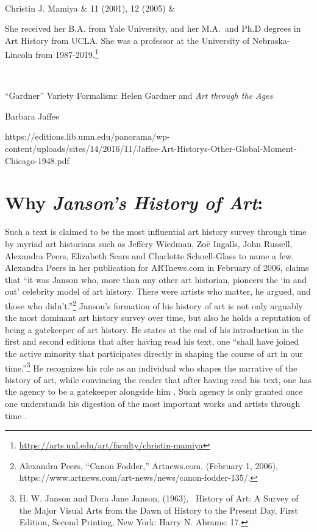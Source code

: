 \documentclass[
  letterpaper,
  DIV=11,
  numbers=noendperiod]{scrreprt}
\begin{document}
\begin{longtable}[]
\begin{minipage}[t]{\linewidth}
{  \hfill\break
}\strut
\end{minipage} \\
Christin J. Mamiya & 11 (2001), 12 (2005) &
\begin{minipage}[t]{\linewidth}\raggedright
She received her B.A. from Yale University, and her M.A.~and Ph.D
degrees in Art History from UCLA. She was a professor at the University
of Nebraska-Lincoln from 1987-2019.\footnote{\url{https://arts.unl.edu/art/faculty/christin-mamiya}

  \hfill\break
}\strut
\end{minipage} \\
\bottomrule
\end{longtable}

``Gardner'' Variety Formalism: Helen Gardner and \emph{Art through the
Ages}

Barbara Jaffee

https://editions.lib.umn.edu/panorama/wp-content/uploads/sites/14/2016/11/Jaffee-Art-Historys-Other-Global-Moment-Chicago-1948.pdf

\hypertarget{why-jansons-history-of-art}{%
\section{\texorpdfstring{Why \emph{Janson's History of
Art}:}{Why Janson's History of Art:}}\label{why-jansons-history-of-art}}

Such a text is claimed to be the most influential art history survey
through time by myriad art historians such as Jeffery Wiedman, Zoë
Ingalls, John Russell, Alexandra Peers, Elizabeth Sears and Charlotte
Schoell-Glass to name a few. Alexandra Peers in her publication for
ARTnews.com in February of 2006, claims that ``it was Janson who, more
than any other art historian, pioneers the `in and out' celebrity model
of art history. There were artists who matter, he argued, and those who
didn't.''\footnote{Alexandra Peers, ``Canon Fodder,'' Artnews.com,
  (February 1, 2006),
  https://www.artnews.com/art-news/news/canon-fodder-135/.} Janson's
formation of his history of art is not only arguably the most dominant
art history survey over time, but also he holds a reputation of being a
gatekeeper of art history. He states at the end of his introduction in
the first and second editions that after having read his text, one
``shall have joined the active minority that participates directly in
shaping the course of art in our time.''\footnote{H. W. Janson and Dora
  Jane Janson, (1963),~ History of Art: A Survey of the Major Visual
  Arts from the Dawn of History to the Present Day, First Edition,
  Second Printing, New York: Harry N. Abrams: 17.} He recognizes his
role as an individual who shapes the narrative of the history of art,
while convincing the reader that after having read his text, one has the
agency to be a gatekeeper alongside him . Such agency is only granted
once one understands his digestion of the most important works and
artists through time .
\end{document}
